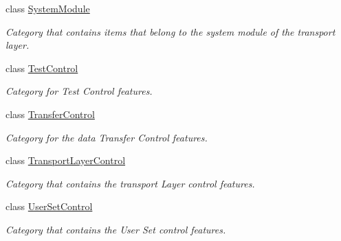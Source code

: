 \begin{DoxyCompactItemize}
class \hyperlink{classmv_i_m_p_a_c_t_1_1acquire_1_1_gen_i_cam_1_1_system_module}{System\+Module}
\begin{DoxyCompactList}\small\item\em Category that contains items that belong to the system module of the transport layer. \end{DoxyCompactList}\item 
class \hyperlink{classmv_i_m_p_a_c_t_1_1acquire_1_1_gen_i_cam_1_1_test_control}{Test\+Control}
\begin{DoxyCompactList}\small\item\em Category for Test Control features. \end{DoxyCompactList}\item 
class \hyperlink{classmv_i_m_p_a_c_t_1_1acquire_1_1_gen_i_cam_1_1_transfer_control}{Transfer\+Control}
\begin{DoxyCompactList}\small\item\em Category for the data Transfer Control features. \end{DoxyCompactList}\item 
class \hyperlink{classmv_i_m_p_a_c_t_1_1acquire_1_1_gen_i_cam_1_1_transport_layer_control}{Transport\+Layer\+Control}
\begin{DoxyCompactList}\small\item\em Category that contains the transport Layer control features. \end{DoxyCompactList}\item 
class \hyperlink{classmv_i_m_p_a_c_t_1_1acquire_1_1_gen_i_cam_1_1_user_set_control}{User\+Set\+Control}
\begin{DoxyCompactList}\small\item\em Category that contains the User Set control features. \end{DoxyCompactList}\end{DoxyCompactItemize}
